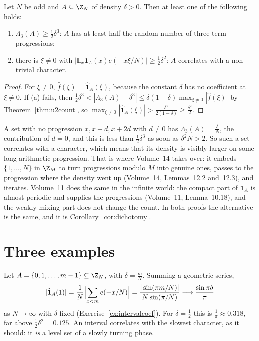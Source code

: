 \begin{corollary}\label{cor:dichotomy}
Let $N$ be odd and $A\subseteq\Z_N$ of density $\delta>0$. Then at least one of the following holds:
\begin{enumerate}[label=(\alph*)]
\item $\Lambda_3(A)\ge\frac12\delta^3$: $A$ has at least half the random number of three-term progressions;
\item there is $\xi\ne0$ with $\bigl|\mathbb E_x\mathbf 1_A(x)e(-x\xi/N)\bigr|\ge\frac12\delta^2$: $A$ correlates with a non-trivial character.
\end{enumerate}
\end{corollary}
\begin{proof}
For $\xi\ne0$, $\hat f(\xi)=\hat{\mathbf 1}_A(\xi)$, because the constant $\delta$ has no coefficient at $\xi\ne0$. If (a) fails, then $\frac12\delta^3<|\Lambda_3(A)-\delta^3|\le\delta(1-\delta)\max_{\xi\ne0}|\hat f(\xi)|$ by Theorem~\ref{thm:u2count}, so $\max_{\xi\ne0}|\hat{\mathbf 1}_A(\xi)|>\frac{\delta^2}{2(1-\delta)}\ge\frac{\delta^2}2$.
\end{proof}

A set with no progression $x,x+d,x+2d$ with $d\ne0$ has $\Lambda_3(A)=\frac\delta N$, the contribution of $d=0$, and this is less than $\frac12\delta^3$ as soon as $\delta^2N>2$. So such a set correlates with a character, which means that its density is visibly larger on some long arithmetic progression. That is where Volume~14 takes over: it embeds $\{1,\dots,N\}$ in $\Z_M$ to turn progressions modulo $M$ into genuine ones, passes to the progression where the density went up (Volume~14, Lemmas~12.2 and~12.3), and iterates. Volume~11 does the same in the infinite world: the compact part of $\mathbf 1_A$ is almost periodic and supplies the progressions (Volume~11, Lemma~10.18), and the weakly mixing part does not change the count. In both proofs the alternative is the same, and it is Corollary~\ref{cor:dichotomy}.

\section{Three examples}\label{sec:threeexamples}

\begin{examplex}
Let $A=\{0,1,\dots,m-1\}\subseteq\Z_N$, with $\delta=\frac mN$. Summing a geometric series,
\[
|\hat{\mathbf 1}_A(1)|=\frac1N\Bigl|\sum_{x<m}e(-x/N)\Bigr|=\frac{|\sin(\pi m/N)|}{N\sin(\pi/N)}\longrightarrow\frac{\sin\pi\delta}\pi
\]
as $N\to\infty$ with $\delta$ fixed (Exercise~\ref{ex:intervalcoef}). For $\delta=\frac12$ this is $\frac1\pi\approx0.318$, far above $\frac12\delta^2=0.125$. An interval correlates with the slowest character, as it should: it \emph{is} a level set of a slowly turning phase.
\end{examplex}

